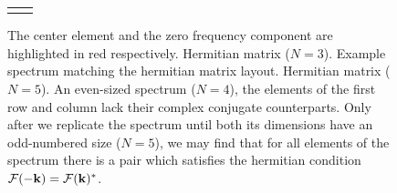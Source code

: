 \begin{figure}
\begin{tabular}{cc}
 \subtop[]{
	$\left(\begin{array}{lllll}
	a   & b   & c             & d   & e   \\
	f   & g   & h             & i   & j   \\
	k   & l   & \color{red} m & l^* & k^* \\
	j^* & i^* & h^*           & g^* & f^* \\
	e^* & d^* & c^*           & b^* & a^* \\
	\end{array}\right)$
	\label{fig:symmetry:even:layout}
 }
 &
 \subtop[]{
	$\left(\begin{array}{llll|l}
	 \num{3.5886 + 0.0i}     & \num{0.5354 - 0.9111i}  & \num{-8.3447 + 0.0i}   & \num{0.5354 + 0.9111i}  & \num{3.5886 + 0.0i} \\
	 \num{-2.0288 - 1.4957i} & \num{-0.2199 - 0.7443i} & \num{2.7433 + 2.5938i} & \num{0.1182 + 0.3465i}  & \num{-2.0288 - 1.4957i} \\
	 \num{-0.5139 + 0.0i}    & \num{0.5448 - 0.2298i}  & \color{red}\num{0}     & \num{0.5448 + 0.2298i}  & \num{-0.5139 + 0.0i} \\
	 \num{-2.0288 + 1.4957i} & \num{0.1182 - 0.3465i}  & \num{2.7433 - 2.5938i} & \num{-0.2199 + 0.7443i} & \num{-2.0288 + 1.4957i} \\
	 \hline
	 \num{3.5886 + 0.0i}     & \num{0.5354 - 0.9111i}  & \num{-8.3447 + 0.0i}   & \num{0.5354 + 0.9111i}  & \num{3.5886 + 0.0i} \\
	\end{array}\right)$
	\label{fig:symmetry:even:example}
 }
\end{tabular}
\caption{
The center element and the zero frequency component are highlighted in red respectively.
 Hermitian matrix ($N=3$).
 Example spectrum matching the hermitian matrix layout.
 Hermitian matrix ($N=5$).
 An even-sized spectrum ($N=4$), the elements of
the first row and column lack their complex conjugate counterparts.
Only after we replicate the spectrum until both its dimensions have an odd-numbered size ($N=5$),
we may find that for all elements of the spectrum there is a pair which satisfies the hermitian
condition $\mathcal{F}(-\mathbf{k})=\mathcal{F}(\mathbf{k})^*$.
}
\label{fig:symmetry}
\end{figure}
